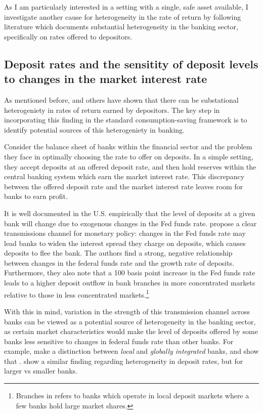 \par As I am particularly interested in a setting with a single, safe asset available, I investigate another cause for heterogeneity in the rate of return  by following literature which documents substantial heterogeneity in the banking sector, specifically on rates offered to depositors.

\subsection{Deposit rates and the sensitity of deposit levels to changes in the market interest rate}

\par As mentioned before, \cite{Deuflhard2018} and others have shown that there can be substational heterogeniety in rates of return earned by depositors. The key step in incorporating this finding in the standard consumption-saving framework is to identify potential sources of this heterogeniety in banking.

\par Consider the balance sheet of banks within the financial sector and the problem they face in optimally choosing the rate to offer on deposits. In a simple setting, they accept deposits at an offered deposit rate, and then hold reserves within the central banking system which earn the market interest rate. This discrepancy between the offered deposit rate and the market interest rate leaves room for banks to earn profit.

\par It is well documented in the U.S. empirically that the level of deposits at a given bank will change due to exogenous changes in the Fed funds rate. \cite{Drechsler2017} propose a clear transmissions channel for monetary policy: changes in the Fed funds rate may lead banks to widen the interest spread they charge on deposits, which causes deposits to flee the bank. The authors find a strong, negative relationship between changes in the federal funds rate and the growth rate of deposits. Furthermore, they also note that a 100 basis point increase in the Fed funds rate leads to a higher deposit outflow in bank branches in more concentrated markets relative to those in less concentrated markets.\footnote{Branches in  refers to banks which operate in local deposit markets where a few banks hold large market shares.}

\par With this in mind, variation in the strength of this transmission channel across banks can be viewed as a potential source of heterogeneity in the banking sector, as certain market characteristics would make the level of deposits offered by some banks less sensitive to changes in federal funds rate than other banks. For example, \cite{Sarkisyan2021} make a distinction between \textit{local} and \textit{globally integrated} banks, and show that . \cite{dAvernas2024} show a similar finding regarding heterogeneity in deposit rates, but for larger vs smaller banks.

